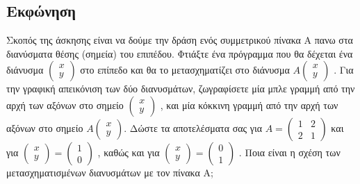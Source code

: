 \documentclass[a4paper,12pt]{article}
\begin{document}
\subsection{Εκφώνηση}
Σκοπός της άσκησης είναι να δούμε την δράση ενός συμμετρικού πίνακα A πανω στα διανύσματα θέσης (σημεία)
του επιπέδου. Φτιάξτε ένα πρόγραμμα που θα δέχεται ένα διάνυσμα
$
    \begin{pmatrix}
        x \\
        y
    \end{pmatrix}
$
στο επίπεδο και θα το μετασχηματίζει στο διάνυσμα
$
    A
    \begin{pmatrix}
        x \\
        y
    \end{pmatrix}
$
. Για την γραφική απεικόνιση των δύο διανυσμάτων, ζωγραφίσετε μία μπλε γραμμή από την αρχή των αξόνων
στο σημείο
$
    \begin{pmatrix}
        x \\
        y
    \end{pmatrix}
$
, και μία κόκκινη γραμμή από την αρχή των αξόνων στο σημείο
$
    A
    \begin{pmatrix}
        x \\
        y
    \end{pmatrix}
$. Δώστε τα αποτελέσματα σας για
$
    A=\begin{pmatrix}
        1 & 2 \\
        2 & 1
    \end{pmatrix}
$
και για
$
    \begin{pmatrix}
        x \\
        y
    \end{pmatrix}=\begin{pmatrix}
        1 \\
        0
    \end{pmatrix}
$
, καθώς και για
$
    \begin{pmatrix}
        x \\
        y
    \end{pmatrix}=\begin{pmatrix}
        0 \\
        1
    \end{pmatrix}
$
. Ποια είναι η σχέση των μετασχηματισμένων διανυσμάτων με τον πίνακα Α;
\end{document}
